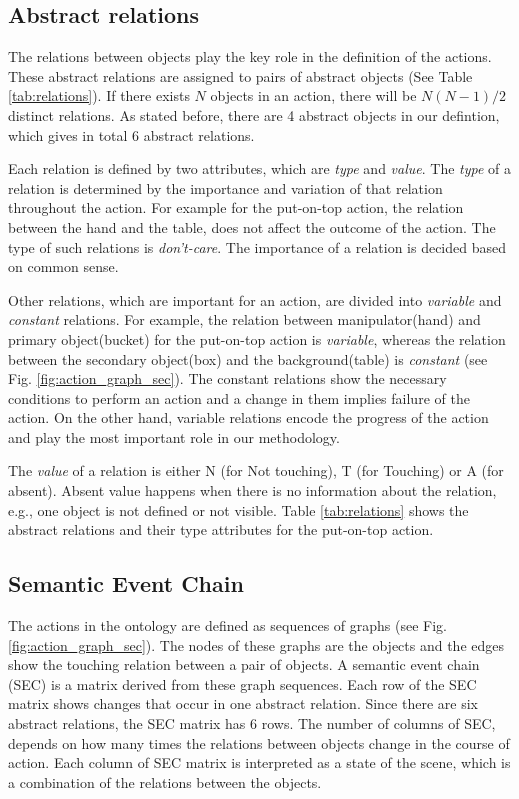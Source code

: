 \subsection{Abstract relations}
The relations between objects play the key role in the definition of the actions.
These abstract relations are assigned to pairs of abstract objects (See Table \ref{tab:relations}).
If there exists $N$ objects in an action,
there will be $N(N-1)/2$ distinct relations.
As stated before, there are 4 abstract objects in our defintion, which gives in total 6 abstract relations.


Each relation is defined by two attributes, which are  \emph{type} and \emph{value}.
The \emph{type} of a relation is determined by the importance and variation of that relation throughout the action.
For example for the put-on-top action, the relation between the hand and the table, does not affect the outcome of the action.
The type of such relations is \emph{don't-care}.
The importance of a relation is decided based on common sense.

Other relations, which are important for an action, are divided into \emph{variable} and \emph{constant} relations.
For example, the relation between manipulator(hand) and primary object(bucket) for the put-on-top action is \emph{variable},
whereas the relation between the secondary object(box) and the background(table) is \emph{constant} (see Fig. \ref{fig:action_graph_sec}).
The constant relations show the necessary conditions to perform an action and a change in them implies failure of the action.
On the other hand, variable relations encode the progress of the action and play the most important role in our methodology.

The \emph{value} of a relation is either N (for Not touching), T (for Touching) or A (for absent).
Absent value happens when there is no information about the relation, e.g., one object is not defined or not visible.
Table \ref{tab:relations} shows the abstract relations and their type attributes for the put-on-top action.




\subsection{Semantic Event Chain}
\label{sec:SEC}
The actions in the ontology are defined as sequences of graphs (see Fig.\ref{fig:action_graph_sec}).
The nodes of these graphs are the objects and the edges show the touching relation between a pair of objects.
A semantic event chain (SEC) \cite{Aksoy11} is a matrix derived from these graph sequences.
Each row of the SEC matrix shows changes that occur in one abstract relation.
Since there are six abstract relations, the SEC matrix has 6 rows.
The number of columns of SEC, depends on how many times the relations between objects change in the course of action.
Each column of SEC matrix is interpreted as a state of the scene, which is a combination of the relations between the objects.



